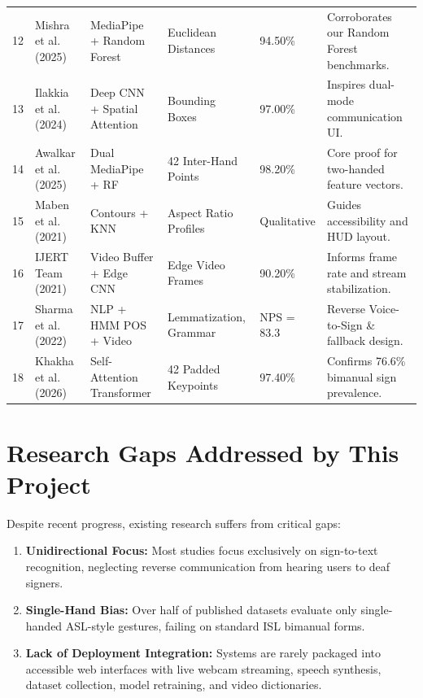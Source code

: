 \begin{longtable}{p{}p{}p{}p{}p{}p{}}
12 & Mishra et al. (2025) \cite{mishra2025} & MediaPipe + Random Forest & Euclidean Distances & 94.50\% & Corroborates our Random Forest benchmarks.\\
13 & Ilakkia et al. (2024) \cite{ilakkia2024} & Deep CNN + Spatial Attention & Bounding Boxes & 97.00\% & Inspires dual-mode communication UI.\\
14 & Awalkar et al. (2025) \cite{awalkar2025} & Dual MediaPipe + RF & 42 Inter-Hand Points & 98.20\% & Core proof for two-handed feature vectors.\\
15 & Maben et al. (2021) \cite{maben2021} & Contours + KNN & Aspect Ratio Profiles & Qualitative & Guides accessibility and HUD layout.\\
16 & IJERT Team (2021) \cite{ijert2021} & Video Buffer + Edge CNN & Edge Video Frames & 90.20\% & Informs frame rate and stream stabilization.\\
17 & Sharma et al. (2022) \cite{sharma2022} & NLP + HMM POS + Video & Lemmatization, Grammar & NPS = 83.3 & Reverse Voice-to-Sign \& fallback design.\\
18 & Khakha et al. (2026) \cite{khakha2026} & Self-Attention Transformer & 42 Padded Keypoints & 97.40\% & Confirms 76.6\% bimanual sign prevalence.\\
\end{longtable}

\section{Research Gaps Addressed by This Project}
Despite recent progress, existing research suffers from critical gaps:
\begin{enumerate}
\item \textbf{Unidirectional Focus:} Most studies focus exclusively on sign-to-text recognition, neglecting reverse communication from hearing users to deaf signers.
\item \textbf{Single-Hand Bias:} Over half of published datasets evaluate only single-handed ASL-style gestures, failing on standard ISL bimanual forms.
\item \textbf{Lack of Deployment Integration:} Systems are rarely packaged into accessible web interfaces with live webcam streaming, speech synthesis, dataset collection, model retraining, and video dictionaries.
\end{enumerate}
